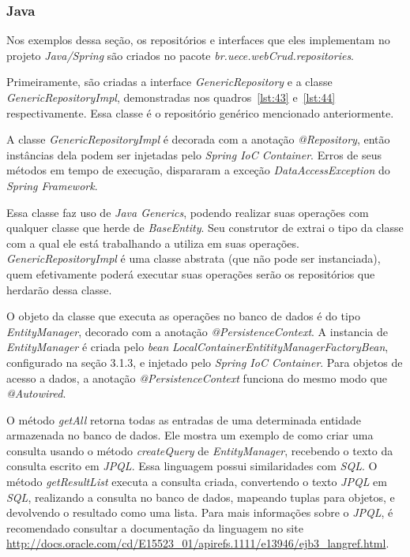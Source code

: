 \documentclass[a4paper,12pt]{article}
\newcommand{\est}[1] {
\textit{#1}}
\newcommand{\classe}[1] {
\textit{#1}}
\newcommand{\lang}[1] {
\textit{#1}}
\newcommand{\annotation}[1] {
\textit{#1}}
\newcommand{\pacote}[1] {
\textit{#1}}
\newcommand{\metodo}[1] {
\textit{#1}}
\newcommand{\javacode}[3] {
	
}
\begin{document}
\subsubsection{Java}

Nos exemplos dessa seção, os repositórios e interfaces que eles implementam no projeto \est{Java/Spring} são criados no pacote \pacote{br.uece.webCrud.repositories}.

Primeiramente, são criadas a interface \classe{GenericRepository} e a classe \classe{GenericRepositoryImpl}, demonstradas nos quadros~\ref{lst:43} e~\ref{lst:44} respectivamente. Essa classe é o repositório genérico mencionado anteriormente.

\javacode{code/43.txt}{Interface GenericRepository}{lst:43}

\javacode{code/44.txt}{Classe GenericRepositoryImpl}{lst:44}

A classe \classe{GenericRepositoryImpl} é decorada com a anotação \annotation{@Repository}, então instâncias dela podem ser injetadas pelo \est{Spring IoC Container}. Erros de seus métodos em tempo de execução, dispararam a exceção \classe{DataAccessException} do \est{Spring Framework}.

Essa classe faz uso de \est{Java Generics}, podendo realizar suas operações com qualquer classe que herde de \classe{BaseEntity}. Seu construtor de extrai o tipo da classe com a qual ele está trabalhando a utiliza em suas operações. \classe{GenericRepositoryImpl} é uma classe abstrata (que não pode ser instanciada), quem efetivamente poderá executar suas operações serão os repositórios que herdarão dessa classe.

O objeto da classe que executa as operações no banco de dados é do tipo \classe{EntityManager}, decorado com a anotação \annotation{@PersistenceContext}. A instancia de \classe{EntityManager} é criada pelo \est{bean} \classe{LocalContainerEntitityManagerFactoryBean}, configurado na seção 3.1.3, e injetado pelo \est{Spring IoC Container}. Para objetos de acesso a dados, a anotação \annotation{@PersistenceContext} funciona do mesmo modo que \annotation{@Autowired}.

O método \metodo{getAll} retorna todas as entradas de uma determinada entidade armazenada no banco de dados. Ele mostra um exemplo de como criar uma consulta usando o método \metodo{createQuery} de \classe{EntityManager}, recebendo o texto da consulta escrito em \lang{JPQL}. Essa linguagem possui similaridades com \lang{SQL}. O método \metodo{getResultList} executa a consulta criada, convertendo o texto \lang{JPQL} em \lang{SQL}, realizando a consulta no banco de dados, mapeando tuplas para objetos, e devolvendo o resultado como uma lista. Para mais informações sobre o \lang{JPQL}, é recomendado consultar a documentação da linguagem no site \url{http://docs.oracle.com/cd/E15523_01/apirefs.1111/e13946/ejb3_langref.html}.
\end{document}

